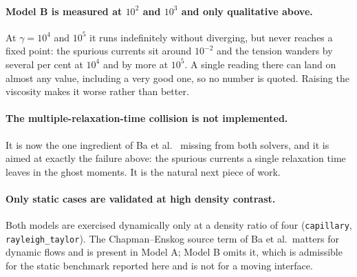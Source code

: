 \documentclass[11pt,a4paper]{article}
\theoremstyle{plain}
\theoremstyle{definition}
\begin{document}
\paragraph{Model B is measured at $10^2$ and $10^3$ and only qualitative above.}
At $\gamma = 10^4$ and $10^5$ it runs indefinitely without diverging, but never
reaches a fixed point: the spurious currents sit around $10^{-2}$ and the
tension wanders by several per cent at $10^4$ and by more at $10^5$. A single
reading there can land on almost any value, including a very good one, so no
number is quoted. Raising the viscosity makes it worse rather than better.

\paragraph{The multiple-relaxation-time collision is not implemented.} It is now
the one ingredient of Ba et al.~\cite{ba2016} missing from both solvers, and it
is aimed at exactly the failure above: the spurious currents a single relaxation
time leaves in the ghost moments. It is the natural next piece of work.

\paragraph{Only static cases are validated at high density contrast.} Both
models are exercised dynamically only at a density ratio of four
(\texttt{capillary}, \texttt{rayleigh\_taylor}). The Chapman--Enskog source term
of Ba et al.\ matters for dynamic flows and is present in Model A; Model B
omits it, which is admissible for the static benchmark reported here and is not
for a moving interface.
\end{document}
